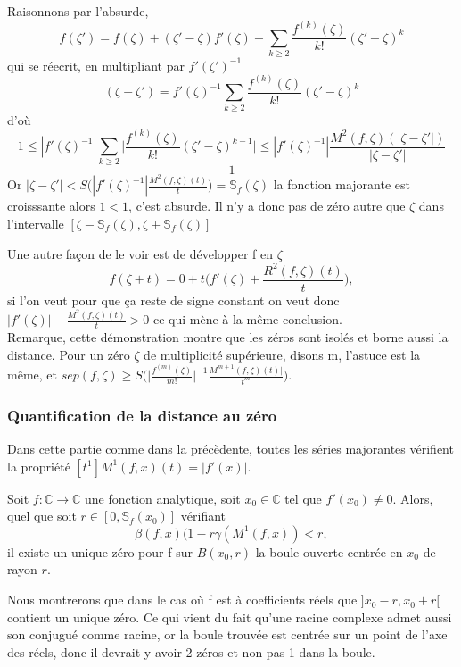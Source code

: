 \documentclass[a4paper,10.5pt]{article}
\begin{document}
	\begin{demonstration}Raisonnons par l'absurde, 
	\[f(\zeta ')=f(\zeta)+(\zeta '-\zeta)f'(\zeta)+ \sum_{k \geq 2}\frac{f^{(k)}(\zeta)}{k!}(\zeta'-\zeta)^k\]
	qui se réecrit, en multipliant par $f'(\zeta ')^{-1}$
	\[(\zeta-\zeta')=f'(\zeta)^{-1} \sum_{k \geq 2}\frac{f^{(k)}(\zeta)}{k!}(\zeta'-\zeta)^k\]
	d'où 
	\[1 \leq |f'(\zeta)^{-1}|\sum_{k \geq 2}  \big|\frac{f^{(k)}(\zeta)}{k!}(\zeta'-\zeta)^{k-1} \big|\leq |f'(\zeta)^{-1}| \frac{M^{2}(f,\zeta)(|\zeta-\zeta'|)}{|\zeta-\zeta'|}\]
	\[1 \]
	Or $|\zeta-\zeta'|<S\Big(|f'(\zeta)^{-1}|\frac{M^{2}(f,\zeta)(t)}{t}\Big)=\mathbb{S}_{f}(\zeta)$ la fonction majorante est croisssante alors $1<1$, c'est absurde. Il n'y a donc  pas de zéro autre que $\zeta$  dans l'intervalle $[\zeta-\mathbb{S}_{f}(\zeta),\zeta+\mathbb{S}_{f}(\zeta)]$
	\end{demonstration} 
	\vspace{7mm}
	\noindent Une autre façon de le voir est de développer f en $\zeta$
	\[f(\zeta +t)=0+t\Big(f'(\zeta)+\frac{R^{2}(f,\zeta)(t)}{t}\Big), \]
	si l'on veut pour que ça reste de signe constant on veut donc $|f'(\zeta)|-\frac{M^{2}(f,\zeta)(t)}{t} >0$ ce qui mène à la même conclusion.\\
	Remarque, cette démonstration montre que les zéros sont isolés et borne aussi la distance. Pour un zéro $\zeta$ de multiplicité supérieure, disons m, l'astuce est la même, et $sep(f,\zeta) \geq S\big(\big|\frac{f^{(m)}(\zeta)}{m!}\big|^{-1}\frac{M^{m+1}(f,\zeta)(t)|}{t^{m}}\big)$.
	\subsubsection{Quantification de la distance au zéro}
	Dans cette partie comme dans la précèdente, toutes les séries majorantes vérifient la propriété $[t^1]M^{1}(f,x)(t)=|f'(x)|$.
	\begin{theorem} Soit $f:\mathbb{C} \rightarrow \mathbb{C}$ une fonction analytique, soit $x_0 \in \mathbb{C}$ tel que $f'(x_0) \neq 0$. Alors, quel que soit $r\in [0,\mathbb{S}_{f}(x_0)]$ vérifiant
	\[\beta(f,x)(1-r\gamma(M^1(f,x))<r,\]
	il existe un unique zéro pour f sur $B(x_0,r)$ la boule ouverte centrée en $x_0$ de rayon $r$. 
	\end{theorem}
	 Nous montrerons que dans le cas où f est à coefficients réels que $]x_0-r,x_0+r[$ contient un unique zéro. Ce qui vient du fait qu'une racine complexe admet aussi son conjugué comme racine, or la boule trouvée est centrée sur un point de l'axe des réels, donc il devrait y avoir 2 zéros et non pas 1 dans la boule.
	 
\end{document}
